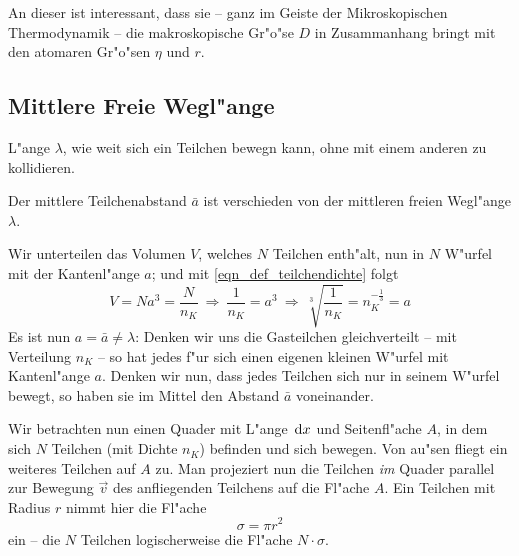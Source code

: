 An dieser ist interessant, dass sie -- ganz im Geiste der
Mikroskopischen Thermodynamik -- die makroskopische Gr"o"se $D$ in
Zusammanhang bringt mit den atomaren Gr"o"sen $\eta$ und $r$.






\subsection{Mittlere Freie Wegl"ange}
\label{kap_mittlere-freie-weglange}

\begin{Def}
    L"ange $\lambda$, wie weit sich ein Teilchen bewegn
   kann, ohne mit einem anderen zu kollidieren.
\end{Def}

\begin{Wichtig}
   Der mittlere Teilchenabstand $\bar a$ ist verschieden von der
   mittleren freien Wegl"ange $\lambda$.
\end{Wichtig}

Wir unterteilen das Volumen $V$, welches $N$ Teilchen enth"alt, nun in
$N$ W"urfel mit der Kantenl"ange $a$; und
mit \eqref{eqn_def_teilchendichte} folgt
\begin{equation}
\label{eq:18}
   V = Na^3 = \frac{N}{n_K} ~ \Rightarrow ~ \frac{1}{n_K} = a^3
~ \Rightarrow ~
\sqrt[3]{\frac{1}{n_K}} = n_K^{-\frac{1}{3}}= a 
\end{equation}
Es ist nun $a = \bar a \neq \lambda$: Denken wir uns die Gasteilchen
gleichverteilt -- mit Verteilung $n_K$ -- so hat jedes f"ur sich einen
eigenen kleinen W"urfel mit Kantenl"ange $a$. Denken wir nun, dass
jedes Teilchen sich nur in seinem W"urfel bewegt, so haben sie im
Mittel den Abstand $\bar a$ voneinander.

\bigskip Wir betrachten nun einen Quader mit L"ange $\, \mathrm{d} x$ und
Seitenfl"ache $A$, in dem sich $N$ Teilchen (mit Dichte $n_K$) befinden
und sich bewegen. Von au"sen fliegt ein weiteres Teilchen auf $A$
zu. Man projeziert nun die Teilchen \emph{im} Quader parallel zur
Bewegung $\vec v$ des anfliegenden Teilchens auf die Fl"ache $A$. Ein
Teilchen mit Radius $r$ nimmt hier die Fl"ache 
\begin{equation}
   \label{eq:18b} 
   \sigma = \pi r^2
\end{equation}
ein -- die $N$ Teilchen logischerweise die Fl"ache $N \cdot \sigma$.

